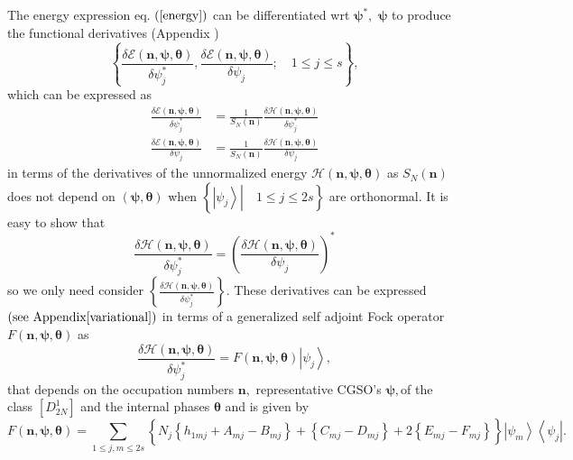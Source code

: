 \documentclass[aps,preprint]{revtex4}%
\begin{document}
The energy expression eq. $\left(  \ref{energy}\right)  $ can be
differentiated wrt $\mathbf{\psi}^{\ast},$ $\mathbf{\psi}$ to produce the
functional derivatives (Appendix )
\begin{equation}
\left\{  \frac{\delta\mathcal{E}\left(  \mathbf{n,\psi,\theta}\right)
}{\delta\psi_{j}^{\ast}},\frac{\delta\mathcal{E}\left(  \mathbf{n,\psi,\theta
}\right)  }{\delta\psi_{j}};\quad1\leq j\leq s\right\}  ,
\end{equation}
which can be expressed as%
\begin{align}
\frac{\delta\mathcal{E}\left(  \mathbf{n,\psi,\theta}\right)  }{\delta\psi
_{j}^{\ast}}  &  =\frac{1}{S_{N}\left(  \mathbf{n}\right)  }\frac
{\delta\mathcal{H}\left(  \mathbf{n,\psi,\theta}\right)  }{\delta\psi
_{j}^{\ast}}\\
\frac{\delta\mathcal{E}\left(  \mathbf{n,\psi,\theta}\right)  }{\delta\psi
_{j}}  &  =\frac{1}{S_{N}\left(  \mathbf{n}\right)  }\frac{\delta
\mathcal{H}\left(  \mathbf{n,\psi,\theta}\right)  }{\delta\psi_{j}}%
\end{align}
in terms of the derivatives of the unnormalized energy $\mathcal{H}\left(
\mathbf{n,\psi,\theta}\right)  $ as $S_{N}\left(  \mathbf{n}\right)  $ does
not depend on $\left(  \mathbf{\psi,\theta}\right)  $ when $\left\{  \left.
\left\vert \psi_{j}\right\rangle \right\vert \quad1\leq j\leq2s\right\}  $ are
orthonormal. It is easy to show that
\begin{equation}
\frac{\delta\mathcal{H}\left(  \mathbf{n,\psi,\theta}\right)  }{\delta\psi
_{j}^{\ast}}=\left(  \frac{\delta\mathcal{H}\left(  \mathbf{n,\psi,\theta
}\right)  }{\delta\psi_{j}}\right)  ^{\ast}%
\end{equation}
so we only need consider $\left\{  \frac{\delta\mathcal{H}\left(
\mathbf{n,\psi,\theta}\right)  }{\delta\psi_{j}^{\ast}}\right\}  .$ These
derivatives can be expressed $\left(  \text{see Appendix\ref{variational}%
}\right)  $ in terms of a generalized self adjoint Fock operator $F\left(
\mathbf{n,\psi,\theta}\right)  $ as
\begin{equation}
\frac{\delta\mathcal{H}\left(  \mathbf{n,\psi,\theta}\right)  }{\delta\psi
_{j}^{\ast}}=F\left(  \mathbf{n,\psi,\theta}\right)  \left\vert \psi
_{j}\right\rangle ,
\end{equation}
that depends on the occupation numbers $\mathbf{n,}$ representative CGSO's
$\mathbf{\psi,}$of the class $\left[  D_{2N}^{1}\right]  $ and the internal
phases $\mathbf{\theta}$ and is given by
\begin{equation}
F\left(  \mathbf{n,\psi,\theta}\right)  =\sum_{1\leq j,m\leq2s}\left\{
N_{j}\left\{  h_{1mj}+A_{mj}-B_{mj}\right\}  +\left\{  C_{mj}-D_{mj}\right\}
+2\overset{}{\left\{  E_{mj}-F_{mj}\right\}  }\right\}  \left\vert \psi
_{m}\right\rangle \left\langle \psi_{j}\right\vert .
\end{equation}
\end{document}
